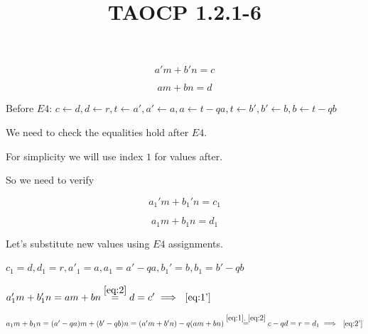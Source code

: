 \documentclass{article}
\title{TAOCP 1.2.1\mbox{-}6}
\begin{document}
\maketitle

\[a'm+b'n = c \tag{1}\label{eq:1}\]

\[am + bn = d \tag{2}\label{eq:2}\]

Before \( E4 \): \( c \leftarrow d, d \leftarrow r, t \leftarrow a', a' \leftarrow a, a \leftarrow t - qa, t \leftarrow b', b' \leftarrow b, b \leftarrow t - qb \)

We need to check the equalities hold after \( E4 \).

For simplicity we will use index \( 1 \) for values after.

So we need to verify

\[a_{1}'m+b_{1}'n = c_{1} \tag{1'}\label{eq:1'}\]

\[a_{1}m + b_{1}n = d_{1} \tag{2'}\label{eq:2'}\]

Let's substitute new values using \( E4 \) assignments.

\( c_{1}=d, d_{1}=r, a'_{1}=a,a_{1}=a'-qa,b_{1}'=b,b_{1}=b'-qb \)

\( a_{1}'m+b_{1}'n=am+bn\overset{\eqref{eq:2}}{=}d=c' \implies~\eqref{eq:1'} \)

\( a_{1}m+b_{1}n=(a'-qa)m+(b'-qb)n=(a'm+b'n)-q(am+bn)\overset{\eqref{eq:1},~\eqref{eq:2}}{=}c-qd = r = d_{1} \implies~\eqref{eq:2'} \)
\end{document}

